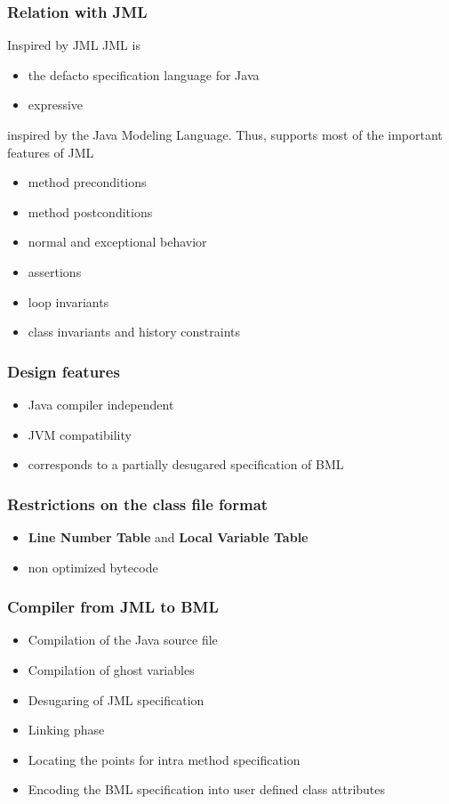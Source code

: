 \documentclass{beamer}
\begin{document}
\begin{frame}[shrink]\frametitle{Relation with JML}
  
  \begin{block}{Inspired by JML}
      JML is 
      \begin{itemize}
	  \item the defacto specification language for Java
	   \item expressive 
	\end{itemize}
  \end{block}

    inspired by the Java Modeling Language. Thus, supports most of the important features of JML
         \begin{itemize}
	    \item method preconditions
	     \item method postconditions
	      \item normal and exceptional behavior
	       \item assertions
	        \item loop invariants 
		 \item class invariants and history constraints 
	 \end{itemize}
        
\end{frame}


\begin{frame}[shrink]\frametitle{Design features}
\begin{itemize}
     \item Java compiler independent
     \item JVM compatibility
     \item corresponds to a partially desugared specification of BML
   
   \end{itemize} 
\end{frame}


\begin{frame}[shrink] \frametitle{Restrictions on the class file format}
\begin{itemize}
     \item \textbf{Line Number Table} and \textbf{Local Variable Table}  
     \item non optimized bytecode
 \end{itemize} 
\end{frame}

\begin{frame}[shrink]\frametitle{Compiler from JML to BML}
     \begin{itemize}
          \item Compilation of the Java source file 
	    \item Compilation of ghost variables
	      \item Desugaring of JML specification
		\item Linking phase
		  \item Locating the points for intra method specification 
		    \item Encoding the BML specification into user defined class attributes
       \end{itemize}
\end{frame}
\end{document}
